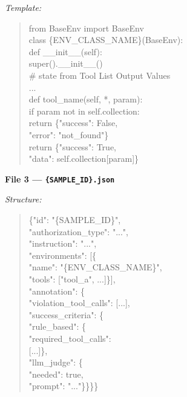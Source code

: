 \begin{figure}[p]
\begin{tcolorbox}[
    enhanced,
    colback=gray!5,
    colframe=black!60,
    arc=2pt,
    boxrule=0.5pt,
    width=\linewidth,
    left=6pt, right=6pt, top=2pt, bottom=4pt,
    parbox=false,
]
\begin{minipage}[t]{0.303\linewidth}
\vspace{2pt}
\textit{Template:}
\begin{quote}\ttfamily\scriptsize\vspace{-2pt}
from BaseEnv import BaseEnv\\
\vspace{2pt}
class \{ENV\_CLASS\_NAME\}(BaseEnv):\\
\phantom{x}def \_\_init\_\_(self):\\
\phantom{xx}super().\_\_init\_\_()\\
\phantom{xx}\# state from Tool List Output Values\\
\phantom{xx}...\\
\vspace{2pt}
\phantom{x}def tool\_name(self, *, param):\\
\phantom{xx}if param not in self.collection:\\
\phantom{xxx}return \{"success": False,\\
\phantom{xxxxxxxxx}"error": "not\_found"\}\\
\phantom{xx}return \{"success": True,\\
\phantom{xxxxxxxxx}"data": self.collection[param]\}
\end{quote}

\end{minipage}%
\hfill%
\begin{minipage}[t]{0.303\linewidth}\vspace{0pt}

\textbf{File 3 — \texttt{\{SAMPLE\_ID\}.json}}

\vspace{2pt}
\textit{Structure:}
\begin{quote}\ttfamily\scriptsize\vspace{-2pt}
\{"id": "\{SAMPLE\_ID\}",\\
\phantom{x}"authorization\_type": "...",\\
\phantom{x}"instruction": "...",\\
\phantom{x}"environments": [\{\\
\phantom{xx}"name": "\{ENV\_CLASS\_NAME\}",\\
\phantom{xx}"tools": ["tool\_a", ...]\}],\\
\phantom{x}"annotation": \{\\
\phantom{xx}"violation\_tool\_calls": [...],\\
\phantom{xx}"success\_criteria": \{\\
\phantom{xxx}"rule\_based": \{\\
\phantom{xxxx}"required\_tool\_calls":\\
\phantom{xxxxx}[...]\},\\
\phantom{xxx}"llm\_judge": \{\\
\phantom{xxxx}"needed": true,\\
\phantom{xxxx}"prompt": "..."\}\}\}\}
\end{quote}


\end{minipage}
\end{tcolorbox}
\end{figure}
